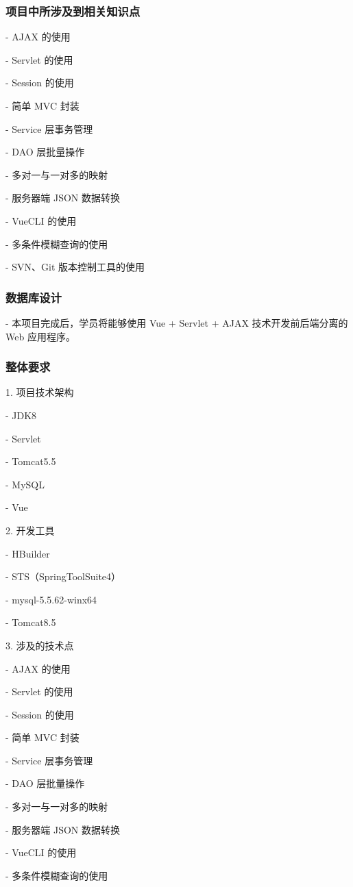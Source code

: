 \subsubsection{项目中所涉及到相关知识点}
- AJAX 的使用

- Servlet 的使用

- Session 的使用

- 简单 MVC 封装

- Service 层事务管理

- DAO 层批量操作

- 多对一与一对多的映射

- 服务器端 JSON 数据转换

- VueCLI 的使用

- 多条件模糊查询的使用

- SVN、Git 版本控制工具的使用

\subsubsection{数据库设计}
- 本项目完成后，学员将能够使用 Vue + Servlet + AJAX 技术开发前后端分离的 Web 应用程序。

\subsubsection{整体要求}
1. 项目技术架构

- JDK8

- Servlet

- Tomcat5.5

- MySQL

- Vue
   
2. 开发工具

- HBuilder

- STS（SpringToolSuite4）

- mysql-5.5.62-winx64

- Tomcat8.5
   
3. 涉及的技术点

- AJAX 的使用

- Servlet 的使用

- Session 的使用

- 简单 MVC 封装

   - Service 层事务管理

   - DAO 层批量操作

   - 多对一与一对多的映射

   - 服务器端 JSON 数据转换

   - VueCLI 的使用

   - 多条件模糊查询的使用


